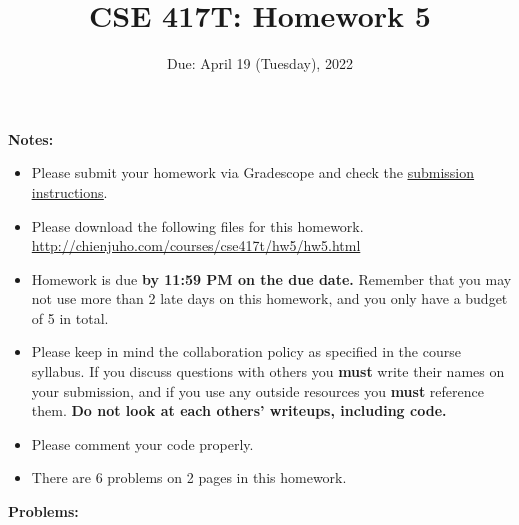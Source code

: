 \documentclass[11pt]{article}
\begin{document}
\title{CSE 417T: Homework 5}
\date{Due: April 19 (Tuesday), 2022}

\maketitle


\noindent \textbf{Notes: } 
\begin{itemize}

\item Please submit your homework via Gradescope and check the \href{http://chienjuho.com/courses/cse417t/hw_instructions.html}{\underline{submission instructions}}.

\item Please download the following files for this homework.\\
    \url{http://chienjuho.com/courses/cse417t/hw5/hw5.html}

\item Homework is due \textbf{by 11:59 PM on the due date.} Remember that
  you may not use more than 2 late days on this homework, and you
  only have a budget of 5 in total.

\item Please keep in mind the collaboration policy as specified in the
  course syllabus. If you discuss questions with 
others you \textbf{must} write their names on your submission, and if
you use any outside resources you \textbf{must} reference
them. \textbf{Do not look at each others' writeups, including code.}

\item Please comment your code properly.

\item There are 6 problems on 2 pages in this homework. 

\end{itemize}

\noindent \textbf{Problems:}
\end{document}

